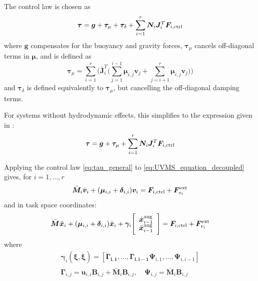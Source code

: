 \documentclass[../main.tex]{subfiles}
\begin{document}
\label{sec:control_law}
The control law is chosen as
\begin{equation}
    \label{eq:tau_general}
    \bm{\tau} = \bm{g} + \bm{\tau}_\mu + \bm{\tau}_{\delta} + \sum_{i=1}^{r}\bm{N}_i \bm{J}_i^T \bm{F}_{i,{\rm ctrl}}
\end{equation}
where $\bm{g}$ compensates for the buoyancy and gravity forces, $\bm{\tau}_{\mu}$ cancels off-diagonal terms in $\bm{\mu}$, and is defined as
\begin{equation}
    \label{eq:ott_tau_mu}
    \bm{\tau}_\mu
    = \sum_{i=1}^{r}\Bigg(\bar{\bm{J}}_i^T
    \Bigg(\sum_{j=1}^{i-1} \bm{\mu}_{i,j}\bm{v}_j
    + \sum_{j=i+1}^{r} \bm{\mu}_{i,j}\bm{v}_j
    \Bigg)\Bigg)
\end{equation}
and $\bm{\tau}_{\delta}$ is defined equivalently to $\bm{\tau}_{\mu}$, but cancelling the off-diagonal damping terms.
\begin{remark}
    For systems without hydrodynamic effects, this simplifies to the expression given in \cite{dietrich2020}:
    \begin{equation}
        \label{eq:tau_no_damping}
        \bm{\tau} = \bm{g} + \bm{\tau}_\mu + \sum_{i=1}^{r}\bm{N}_i \bm{J}_i^T \bm{F}_{i,{\rm ctrl}}
    \end{equation}
\end{remark}
Applying the control law \eqref{eq:tau_general} to \eqref{eq:UVMS_equation_decoupled} gives, for $ i=1, \ldots, r$
\begin{equation}
    \label{eq:auv_control_law_tau_UVMS}
    \setlength{\abovedisplayskip}{4pt}
    \setlength{\belowdisplayskip}{4pt}
    \bar{\bm{M}}_i \dot{\bm{v}}_i + (\bm{\mu}_{i,i} + \bm{\delta}_{i,i})\bm{v}_i = \bm{F}_{i, {\rm ctrl}} + \bm{F}^{\rm ext}_{v_i}
\end{equation}
and in task space coordinates:
\begin{equation}
    \label{eq:robman-controlled_decoupled_task}
    \bar{\bm{M}} \ddot{\bm{x}}_i + (\bm{\mu}_{i,i} + \bm{\delta}_{i,i}) \dot{\bm{x}}_i + \bm{\gamma}_i \Bigg[ \begin{array}{c}
        \dot{\bm{x}}_{i-1}^{\rm aug} \\
        \ddot{\bm{x}}_{i-1}^{\rm aug} \\
        \end{array}\Bigg]
    = \bm{F}_{i,{\rm ctrl}}
    + \bm{F}^{\rm ext}_{v_i}
\end{equation}
where
\begin{subequations}
    \label{eq:gamma}
    \begin{align}
        \bm{\gamma}_i(\bm{\xi},\dot{\bm{\xi}}) = [\bm{\Gamma_{i,1}}, \dots, \bm{\Gamma_{i,i-1}} \bm{\Psi}_{i, 1}, \dots, \bm{\Psi}_{i, i-1}]\\
        \bm{\Gamma}_{i, j} = \bm{u}_{i,i}\bm{B}_{i,j} + \bar{\bm{M}}_i\dot{\bm{B}}_{i,j}, \quad
        \bm{\Psi}_{i, j} = \bar{\bm{M}}_i \bm{B}_{i,j}
    \end{align}
\end{subequations}
\end{document}
